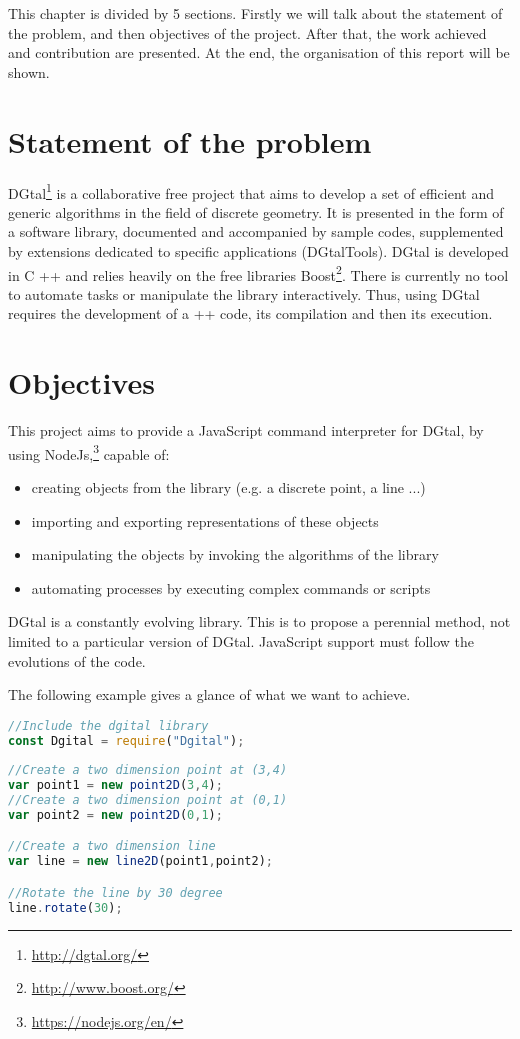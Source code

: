 This chapter is divided by 5 sections. Firstly we will talk about the statement of the problem, and then objectives of the project. After that, the work achieved and contribution are presented. At the end, the organisation of this report will be shown.

\section{Statement of the problem}

DGtal\footnote{\url{http://dgtal.org/}} is a collaborative free project that aims to develop a set of efficient and generic algorithms in the field of discrete geometry. It is presented in the form of a software library, documented and accompanied by sample codes, supplemented by extensions dedicated to specific applications (DGtalTools). DGtal is developed in C ++ and relies heavily on the free libraries Boost\footnote{\url{http://www.boost.org/}}. There is currently no tool to automate tasks or manipulate the library interactively. Thus, using DGtal requires the development of a ++ code, its compilation and then its execution.

\section{Objectives}

This project aims to provide a JavaScript command interpreter for DGtal, by using NodeJs,\footnote{\url{https://nodejs.org/en/}} capable of:
\begin{itemize}
    \item creating objects from the library (e.g. a discrete point, a line ...)
    \item importing and exporting representations of these objects
    \item manipulating the objects by invoking the algorithms of the library
    \item automating processes by executing complex commands or scripts
\end{itemize}
    
DGtal is a constantly evolving library. This is to propose a perennial method, not limited to a particular version of DGtal. JavaScript support must follow the evolutions of the code. 

The following example gives a glance of what we want to achieve.

       \begin{lstlisting}[language=JavaScript, caption= simple objective example]
//Include the dgital library
const Dgital = require("Dgital"); 
         
//Create a two dimension point at (3,4)  
var point1 = new point2D(3,4);
//Create a two dimension point at (0,1)  
var point2 = new point2D(0,1);

//Create a two dimension line 
var line = new line2D(point1,point2);

//Rotate the line by 30 degree
line.rotate(30);
        \end{lstlisting}

